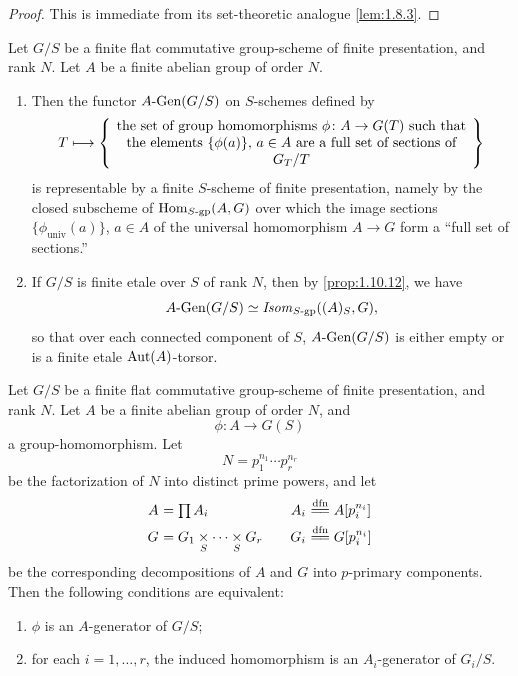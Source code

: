 \begin{proof}
This is immediate from its set-theoretic analogue \ref{lem:1.8.3}.
\end{proof}

\begin{proposition}\label{prop:1.10.13}
Let $G/S$ be a finite flat commutative group-scheme of finite presentation, and rank $N$. Let $A$ be a finite abelian group of order $N$.
\begin{enumerate}[(1)]
\item Then the functor $A\text{\rm -Gen}(G/S)$ on $S$-schemes defined by
\[
T \longmapsto \left\{ \parbox{0.75\linewidth}{\centering the set of group homomorphisms $\phi \colon A \to G(T)$ such that the elements $\{\phi(a)\}$, $a \in A$ are a full set of sections of $G_T/T$} \right\}
\]
is representable by a finite $S$-scheme of finite presentation, namely by the closed subscheme of $\operatorname{Hom}_{S\text{\rm -gp}}(A, G)$ over which the image sections $\{\phi_{\mathrm{univ}}(a)\}$, $a \in A$ of the universal homomorphism $A \to G$ form a ``full set of sections.''
\item If $G/S$ is finite etale over $S$ of rank $N$, then by \ref{prop:1.10.12}, we have
\[
A\text{\rm -Gen}(G/S) \simeq \mathit{Isom}_{S\text{\rm -gp}}((A)_S, G),
\]
so that over each connected component of $S$, $A\text{\rm -Gen}(G/S)$ is either empty or is a finite etale $\operatorname{Aut}(A)$-torsor.
\end{enumerate}
\end{proposition}

\begin{proposition}\label{prop:1.10.14}
Let $G/S$ be a finite flat commutative group-scheme of finite presentation, and rank $N$. Let $A$ be a finite abelian group of order $N$, and
\[
\phi \colon A \longrightarrow G(S)
\]
a group-homomorphism. Let
\[
N = p_1^{n_1} \cdots p_r^{n_r}
\]
be the factorization of $N$ into distinct prime powers, and let
\[
\begin{array}{r@{\ }l@{\qquad}r@{\ }l}
A &= \prod A_i & A_i &\xlongequal{dfn} A[p_i^{n_i}] \\[4pt]
G &= G_1 \underset{S}{\times} \cdots \underset{S}{\times} G_r & G_i &\xlongequal{dfn} G[p_i^{n_i}]
\end{array}
\]
be the corresponding decompositions of $A$ and $G$ into $p$-primary components. Then the following conditions are equivalent:
\begin{enumerate}[(1)]
\item $\phi$ is an $A$-generator of $G/S$;
\item for each $i = 1, \dots, r$, the induced homomorphism is an $A_i$-generator of $G_i/S$.
\end{enumerate}
\end{proposition}

